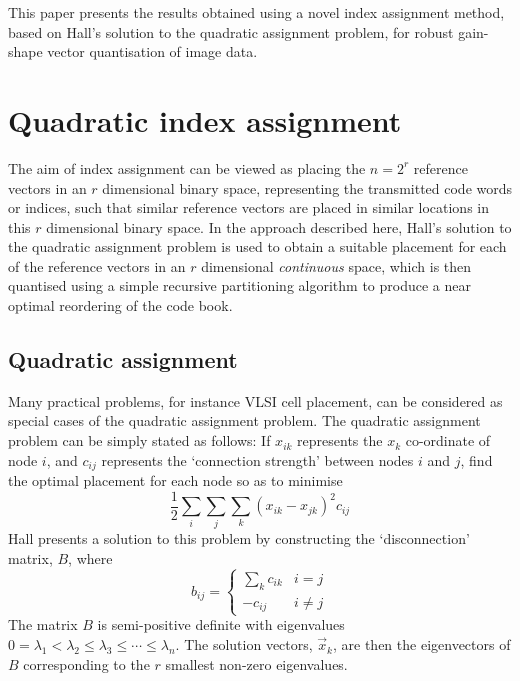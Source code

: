 \documentclass[a4paper]{report}
\begin{document}
This paper presents the results obtained using a novel index assignment
method, based on Hall's solution to the quadratic
assignment problem, for robust gain-shape vector quantisation of
image data.

\chapter{Quadratic index assignment}

The aim of index assignment can be viewed as placing the $n=2^r$ reference
vectors in an $r$ dimensional binary space, representing the transmitted code
words or indices, such that similar reference vectors are placed in similar
locations in this $r$ dimensional binary space.  In the approach described
here, Hall's solution to the quadratic assignment problem is used
to obtain a suitable placement for each of the reference vectors in an $r$
dimensional \emph{continuous} space, which is then quantised using a simple
recursive partitioning algorithm to produce a near optimal reordering of the
code book.
\section{Quadratic assignment}

Many practical problems, for instance VLSI cell placement, can
be considered as special cases of the quadratic assignment problem.  The
quadratic assignment problem can be simply stated as follows:  If $x_{ik}$
represents the $x_k$ co-ordinate of node $i$, and $c_{ij}$ represents the
`connection strength' between nodes $i$ and $j$, find the optimal placement
for each node so as to minimise
%
\begin{displaymath}
   \frac{1}{2}\sum_i\sum_j\sum_k(x_{ik}-x_{jk})^2c_{ij}
\end{displaymath}
%
Hall presents a solution to this problem by constructing the
`disconnection' matrix, $B$, where
%
\begin{displaymath}
   b_{ij} =
   \left\{
   \begin{array}{ll}
   \sum_k c_{ik} & i = j\\
   -c_{ij} & i \neq j
   \end{array}
   \right.
\end{displaymath}
%
The matrix $B$ is semi-positive definite with eigenvalues
$0 = \lambda_1 < \lambda_2 \leq \lambda_3 \leq \cdots \leq \lambda_n$.
The solution vectors, $\vec{x}_k$, are then the eigenvectors of $B$
corresponding to the $r$ smallest non-zero eigenvalues.
\end{document}
